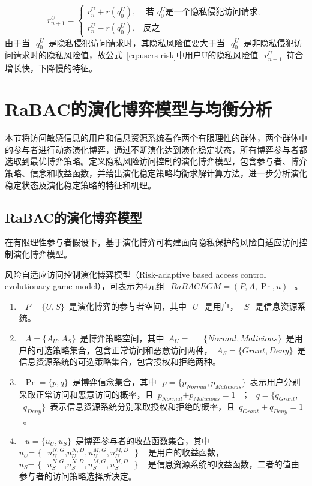 \begin{equation}\label{eq:users-risk}
r_{n+1}^{U}=\begin{cases}
r_{n}^{U}+r(q_0^U), & \text{ 若 } q_0^U \text{是一个隐私侵犯访问请求}; \\ 
r_{n}^{U}-r(q_0^U),& \text{反之}
\end{cases}
\end{equation} 
由于当~$~q_{0}^{U}$~是隐私侵犯访问请求时，其隐私风险值要大于当~$~q_{0}^{U}$~是非隐私侵犯访问请求时的隐私风险值，故公式~\ref{eq:users-risk}中用户U的隐私风险值~$~r_{n+1}^{U}$~符合增长快，下降慢的特征。

\section{RaBAC的演化博弈模型与均衡分析}
\label{sec:evolutionary-game-model}
本节将访问敏感信息的用户和信息资源系统看作两个有限理性的群体，两个群体中的参与者进行动态演化博弈，通过不断演化达到演化稳定状态，所有博弈参与者都选取到最优博弈策略。定义隐私风险访问控制的演化博弈模型，包含参与者、博弈策略、信念和收益函数，并给出演化稳定策略均衡求解计算方法，进一步分析演化稳定状态及演化稳定策略的特征和机理。

\subsection{RaBAC的演化博弈模型}
\label{subsec:evolutionary-game-model}
在有限理性参与者假设下，基于演化博弈可构建面向隐私保护的风险自适应访问控制演化博弈模型。
\begin{definition}
	风险自适应访问控制演化博弈模型（Risk-adaptive based access control evolutionary game model），可表示为4元组~$~RaBACEGM=(P,A,\Pr ,u)~$~。
	\begin{enumerate}
		\item ~$~P=\{U,S\}$~是演化博弈的参与者空间，其中~$~U~$~是用户，~$~S~$~是信息资源系统。
		\item ~$~A=\{{{A}_{U}},{{A}_{S}}\}$~是博弈策略空间，其中~${{A}_{U}}=~$~ ~$\{Normal,Malicious\}$~是用户的可选策略集合，包含正常访问和恶意访问两种，~${{A}_{S}}=\{Grant,Deny\}$~是信息资源系统的可选策略集合，包含授权和拒绝两种。
		\item ~$\Pr =\{p,q\}$~是博弈信念集合，其中~$~p=\{{{p}_{Normal}},{{p}_{Malicious}}\}$~表示用户分别采取正常访问和恶意访问的概率，且~${{p}_{Normal}}\text{+}{{p}_{Malicious}}=1~$~；~$~q=\{{{q}_{Grant}},~$~ ~${{q}_{Deny}}\}$~表示信息资源系统分别采取授权和拒绝的概率，且~${{q}_{Grant}}+{{q}_{Deny}}=1~$~。
		\item ~$~u=\{{{u}_{U}},{{u}_{S}}\}$~是博弈参与者的收益函数集合，其中~${{u}_{U}}\text{= }\!\!\{\!\!\text{ }u_{U}^{N,G}\text{,}u_{U}^{N,D},u_{U}^{M,G},u_{U}^{M,D}\text{ }\!\!\}\!\!\text{ }$~是用户的收益函数，~${{u}_{S}}\text{= }\!\!\{\!\!\text{ }u_{S}^{N,G}\text{,}u_{S}^{N,D},u_{S}^{M,G},u_{S}^{M,D}\text{ }\!\!\}\!\!\text{ }$~是信息资源系统的收益函数，二者的值由参与者的访问策略选择所决定。
		
	\end{enumerate}
\end{definition}

